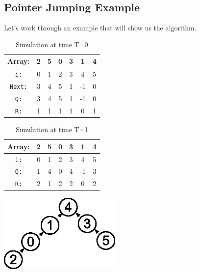 \documentclass[twoside]{article}
\begin{document}
\subsection{Pointer Jumping Example}
Let's work through an example that will show us the algorithm.

\begin{center}
\begin{table}[h]
\center
\begin{tabular}{ |c|c|c|c|c|c|c| } 
 \hline
 \textbf{Array:} & 2 & 5 & 0 & 3 & 1 & 4 \\
 \hline
 \texttt{i:} & 0 & 1 & 2 & 3 & 4 & 5 \\ 
 \texttt{Next:} & 3 & 4 & 5 & 1 & -1 & 0 \\ 
 \texttt{Q:} & 3 & 4 & 5 & 1 & -1 & 0 \\ 
 \texttt{R:} & 1 & 1 & 1 & 1 & 0 & 1 \\ 
 \hline
\end{tabular}
\caption{Simulation at time T=0}
\end{table}
\end{center}


\begin{table}[H]
    \begin{minipage}[H]{.5\textwidth }
        \footnotesize
        \begin{tabular}{ |c|c|c|c|c|c|c| } 
 \hline
 \textbf{Array:} & 2 & 5 & 0 & 3 & 1 & 4 \\
 \hline
 \texttt{i:} & 0 & 1 & 2 & 3 & 4 & 5 \\ 
 \texttt{Q:} & 1 & 4 & 0 & 4 & -1 & 3 \\ 
 \texttt{R:} & 2 & 1 & 2 & 2 & 0 & 2 \\ 
 \hline
        \end{tabular}
        \caption{Simulation at time T=1}
    \end{minipage}%
    \begin{minipage}[H]{.5\textwidth}
        \includegraphics[width=0.45\textwidth, scale=0.5]{img/iter_1.eps}
    \end{minipage}
\end{table}
\end{document}
